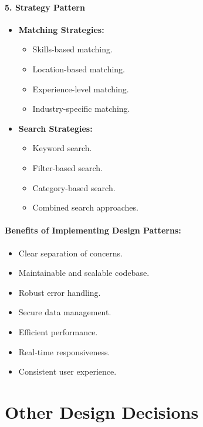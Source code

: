 \paragraph{5. Strategy Pattern}
\begin{itemize}
    \item \textbf{Matching Strategies:}
    \begin{itemize}
        \item Skills-based matching.
        \item Location-based matching.
        \item Experience-level matching.
        \item Industry-specific matching.
    \end{itemize}
    \item \textbf{Search Strategies:}
    \begin{itemize}
        \item Keyword search.
        \item Filter-based search.
        \item Category-based search.
        \item Combined search approaches.
    \end{itemize}
\end{itemize}

\paragraph{Benefits of Implementing Design Patterns:}
\begin{itemize}
    \item Clear separation of concerns.
    \item Maintainable and scalable codebase.
    \item Robust error handling.
    \item Secure data management.
    \item Efficient performance.
    \item Real-time responsiveness.
    \item Consistent user experience.
\end{itemize}

\section{Other Design Decisions}
\label{sec:other_design_decisions}

